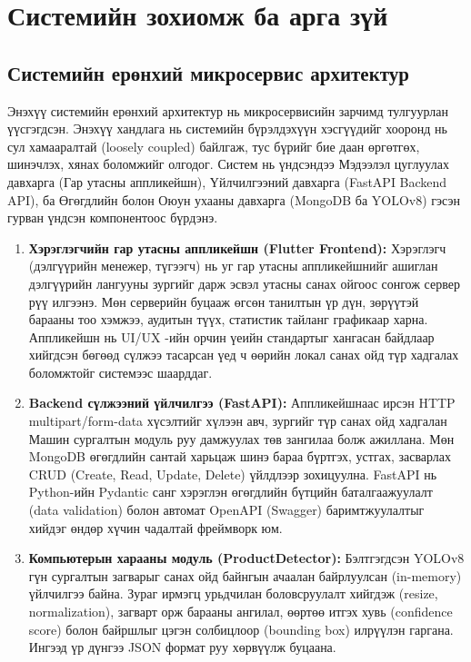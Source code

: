 \chapter{Системийн зохиомж ба арга зүй}

\section{Системийн ерөнхий микросервис архитектур}
Энэхүү системийн ерөнхий архитектур нь микросервисийн зарчимд тулгуурлан үүсгэгдсэн. Энэхүү хандлага нь системийн бүрэлдэхүүн хэсгүүдийг хооронд нь сул хамааралтай (loosely coupled) байлгаж, тус бүрийг бие даан өргөтгөх, шинэчлэх, хянах боломжийг олгодог. Систем нь үндсэндээ Мэдээлэл цуглуулах давхарга (Гар утасны аппликейшн), Үйлчилгээний давхарга (FastAPI Backend API), ба Өгөгдлийн болон Оюун ухааны давхарга (MongoDB ба YOLOv8) гэсэн гурван үндсэн компонентоос бүрдэнэ.

\begin{enumerate}
    \item \textbf{Хэрэглэгчийн гар утасны аппликейшн (Flutter Frontend):} Хэрэглэгч (дэлгүүрийн менежер, түгээгч) нь уг гар утасны аппликейшнийг ашиглан дэлгүүрийн лангууны зургийг дарж эсвэл утасны санах ойгоос сонгож сервер рүү илгээнэ. Мөн серверийн буцааж өгсөн танилтын үр дүн, зөрүүтэй барааны тоо хэмжээ, аудитын түүх, статистик тайланг графикаар харна. Аппликейшн нь UI/UX -ийн орчин үеийн стандартыг хангасан байдлаар хийгдсэн бөгөөд сүлжээ тасарсан үед ч өөрийн локал санах ойд түр хадгалах боломжтойг системээс шаарддаг.
    \item \textbf{Backend сүлжээний үйлчилгээ (FastAPI):} Аппликейшнаас ирсэн HTTP multipart/form-data хүсэлтийг хүлээн авч, зургийг түр санах ойд хадгалан Машин сургалтын модуль руу дамжуулах төв зангилаа болж ажиллана. Мөн MongoDB өгөгдлийн сантай харьцаж шинэ бараа бүртгэх, устгах, засварлах CRUD (Create, Read, Update, Delete) үйлдлээр зохицуулна. FastAPI нь Python-ийн Pydantic санг хэрэглэн өгөгдлийн бүтцийн баталгаажуулалт (data validation) болон автомат OpenAPI (Swagger) баримтжуулалтыг хийдэг өндөр хүчин чадалтай фреймворк юм.
    \item \textbf{Компьютерын харааны модуль (ProductDetector):} Бэлтгэгдсэн YOLOv8 гүн сургалтын загварыг санах ойд байнгын ачаалан байрлуулсан (in-memory) үйлчилгээ байна. Зураг ирмэгц урьдчилан боловсруулалт хийгдэж (resize, normalization), загварт орж барааны ангилал, өөртөө итгэх хувь (confidence score) болон байршлыг цэгэн солбицлоор (bounding box) илрүүлэн гаргана. Ингээд үр дүнгээ JSON формат руу хөрвүүлж буцаана.
\end{enumerate}

